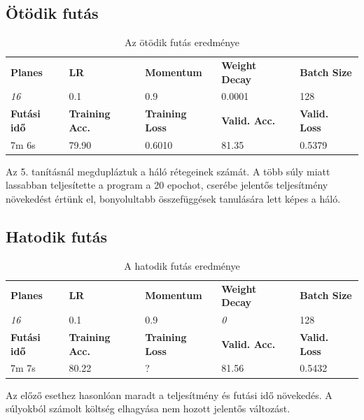 \newpage
\subsection{Ötödik futás}
\begin{table}[h]
	\begin{tabular}{|l|l|l|l|l|}
		\hline
		\textbf{Planes} & \textbf{LR} & \textbf{Momentum} & \textbf{Weight Decay} & \textbf{Batch Size} \\
		\textit{16} & 0.1 & 0.9 & 0.0001 & 128 \\ \hline
		\textbf{Futási idő} & \textbf{Training Acc.} & \textbf{Training Loss} & \textbf{Valid. Acc.} & \textbf{Valid. Loss} \\
		7m 6s & 79.90 & 0.6010 & 81.35 & 0.5379 \\ \hline
	\end{tabular}
	\caption{Az ötödik futás eredménye}
\end{table}
Az 5. tanításnál megdupláztuk a háló rétegeinek számát. A több súly miatt lassabban teljesítette a program a 20 epochot, cserébe jelentős teljesítmény növekedést értünk el, bonyolultabb összefüggések tanulására lett képes a háló. 


\subsection{Hatodik futás}
\begin{table}[h]
	\begin{tabular}{|l|l|l|l|l|}
		\hline
		\textbf{Planes} & \textbf{LR} & \textbf{Momentum} & \textbf{Weight Decay} & \textbf{Batch Size} \\
		\textit{16} & 0.1 & 0.9 & \textit{0} & 128 \\ \hline
		\textbf{Futási idő} & \textbf{Training Acc.} & \textbf{Training Loss} & \textbf{Valid. Acc.} & \textbf{Valid. Loss} \\
		7m 7s & 80.22 & ? & 81.56 & 0.5432 \\ \hline
	\end{tabular}
	\caption{A hatodik futás eredménye}
\end{table}
Az előző esethez hasonlóan maradt a teljesítmény és futási idő növekedés. A súlyokból számolt költség elhagyása nem hozott jelentős változást.

